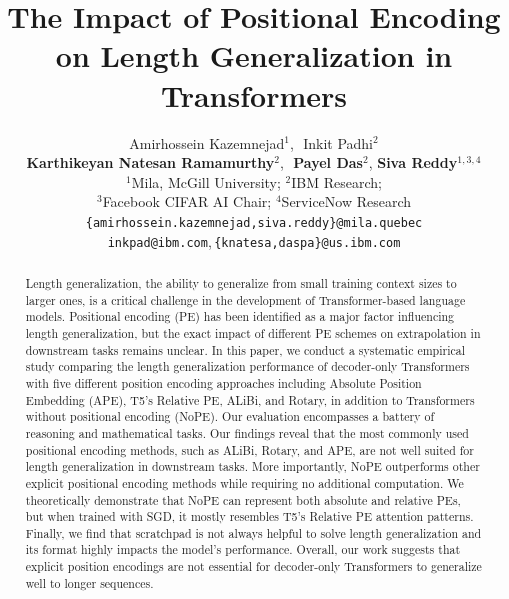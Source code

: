 \documentclass{article}
\title{The Impact of Positional Encoding on Length Generalization in Transformers}
\author{%
}
\author{
  Amirhossein Kazemnejad$^{1}$,\,\, Inkit Padhi$^{2}$\\ \textbf{Karthikeyan Natesan Ramamurthy}$^{2}$,\,\,  \textbf{Payel Das}$^{2}$,\,\,\textbf{Siva Reddy}$^{1,3,4}$ \vspace{0.2em} \\
$^1$Mila, McGill University; $^2$IBM Research; \\ $^3$Facebook CIFAR AI Chair; $^4$ServiceNow Research \vspace{0.1em}\\ 
  \texttt{\{amirhossein.kazemnejad,siva.reddy\}@mila.quebec} \\
  \texttt{inkpad@ibm.com},\,\texttt{\{knatesa,daspa\}@us.ibm.com} \\
  }
\begin{document}
\maketitle


\begin{abstract}
  Length generalization, the ability to generalize from small training context sizes to larger ones, is a critical challenge in the development of Transformer-based language models.
  Positional encoding (PE) has been identified as a major factor influencing length generalization, but the exact impact of different PE schemes on extrapolation in downstream tasks remains unclear.
  In this paper, we conduct a systematic empirical study comparing the length generalization performance of decoder-only Transformers with five different position encoding approaches including Absolute Position Embedding (APE), T5's Relative PE, ALiBi, and Rotary, in addition to Transformers without positional encoding (NoPE).
  Our evaluation encompasses a battery of reasoning and mathematical tasks.
  Our findings reveal that the most commonly used positional encoding methods, such as ALiBi, Rotary, and APE, are not well suited for length generalization in downstream tasks.
  More importantly, NoPE outperforms other explicit positional encoding methods while requiring no additional computation.
  We theoretically demonstrate that NoPE can represent both absolute and relative PEs, but when trained with SGD, it mostly resembles T5's Relative PE attention patterns.
  Finally, we find that scratchpad is not always helpful to solve length generalization and its format highly impacts the model's performance.
  Overall, our work suggests that explicit position encodings are not essential for decoder-only Transformers to generalize well to longer sequences.
\end{abstract}
\end{document}
